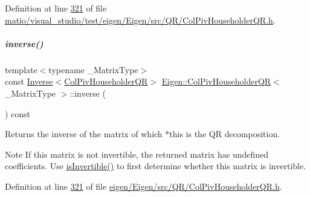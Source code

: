 Definition at line \hyperlink{matio_2visual__studio_2test_2eigen_2_eigen_2src_2_q_r_2_col_piv_householder_q_r_8h_source_l00321}{321} of file \hyperlink{matio_2visual__studio_2test_2eigen_2_eigen_2src_2_q_r_2_col_piv_householder_q_r_8h_source}{matio/visual\+\_\+studio/test/eigen/\+Eigen/src/\+Q\+R/\+Col\+Piv\+Householder\+Q\+R.\+h}.

\mbox{\label{group___q_r___module_a31c45402e74774d9cd13af0e57a6b72f}} 
\subparagraph{\texorpdfstring{inverse()}{inverse()}\hspace{0.1cm}{\footnotesize\ttfamily [2/2]}}
{\footnotesize\ttfamily template$<$typename \+\_\+\+Matrix\+Type$>$ \\
const \hyperlink{class_eigen_1_1_inverse}{Inverse}$<$\hyperlink{group___q_r___module_class_eigen_1_1_col_piv_householder_q_r}{Col\+Piv\+Householder\+QR}$>$ \hyperlink{group___q_r___module_class_eigen_1_1_col_piv_householder_q_r}{Eigen\+::\+Col\+Piv\+Householder\+QR}$<$ \+\_\+\+Matrix\+Type $>$\+::inverse (\begin{DoxyParamCaption}{ }\end{DoxyParamCaption}) const\hspace{0.3cm}{\ttfamily [inline]}}

\begin{DoxyReturn}{Returns}
the inverse of the matrix of which $\ast$this is the QR decomposition.
\end{DoxyReturn}
\begin{DoxyNote}{Note}
If this matrix is not invertible, the returned matrix has undefined coefficients. Use \hyperlink{group___q_r___module_a945720f8d683f8ebe97fa807edd3142a}{is\+Invertible()} to first determine whether this matrix is invertible. 
\end{DoxyNote}


Definition at line \hyperlink{eigen_2_eigen_2src_2_q_r_2_col_piv_householder_q_r_8h_source_l00321}{321} of file \hyperlink{eigen_2_eigen_2src_2_q_r_2_col_piv_householder_q_r_8h_source}{eigen/\+Eigen/src/\+Q\+R/\+Col\+Piv\+Householder\+Q\+R.\+h}.

